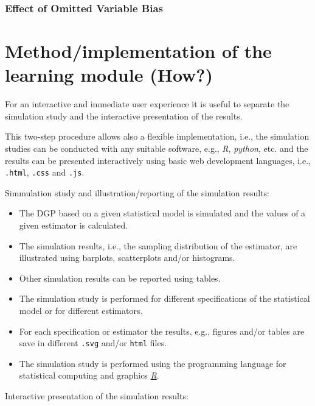 \documentclass{article}
\begin{document}

\subsubsection{Effect of Omitted Variable Bias}






\section{Method/implementation of the learning module (How?)}

For an interactive and immediate user experience it is useful to separate the simulation study and the interactive presentation of the results. 

This two-step procedure allows also a flexible implementation, i.e., the simulation studies can be conducted with any suitable software, e.g., \emph{R}, \emph{python}, etc. and the results can be presented interactively using basic web development languages, i.e., \texttt{.html}, \texttt{.css} and \texttt{.js}.

Simmulation study and illustration/reporting of the simulation results:

\begin{itemize}
	\item The DGP based on a given statistical model is simulated and the values of a given estimator is calculated.
	\item The simulation results, i.e., the sampling distribution of the estimator, are illustrated using  barplots, scatterplots and/or histograms.
	\item Other simulation results can be reported using tables.
	\item The simulation study is performed for different specifications of the statistical model or for different estimators.
	\item For each specification or estimator the results, e.g., figures and/or tables are save in different \texttt{.svg} and/or \texttt{html} files.
	\item The simulation study is performed using the programming language for statistical computing and graphics \href{https://www.r-project.org/}{\emph{R}}.	
\end{itemize}

Interactive presentation of the simulation results:
\end{document}
